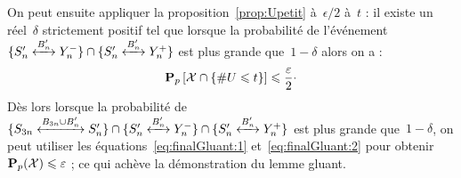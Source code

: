 			On peut ensuite appliquer la proposition~\ref{prop:Upetit} à~$\epsilon/2$ à~$t$ : il existe un réel~$\delta$ strictement positif tel que lorsque la probabilité de l'événement~$\{\relie[B_n']{S_n'}{Y_n^-}\}\cap\{\relie[B_n']{S_n'}{Y_n^+}\}$ est plus grande que~$1-\delta$ alors on a :
			\begin{equation}\label{eq:finalGluant:2}
				\Pp{\mathcal{X}\cap\{\#U\leq t\}}
				\leq
				\frac{\epsilon}{2}
				\cdot %
			\end{equation}
			Dès lors lorsque la probabilité de~$\{\relie[B_{3n}\cup B_n']{S_{3n}}{S_n'}\} \cap \{\relie[B_n']{S_n'}{Y_n^-}\} \cap \{\relie[B_n']{S_n'}{Y_n^+}\}$ est plus grande que~$1-\delta$, on peut utiliser les équations~\ref{eq:finalGluant:1} et~\ref{eq:finalGluant:2} pour obtenir~$\bm{\mathrm{P}}_{p}(\mathcal{X}) \leqslant \varepsilon$ ; ce qui achève la démonstration du lemme gluant.


